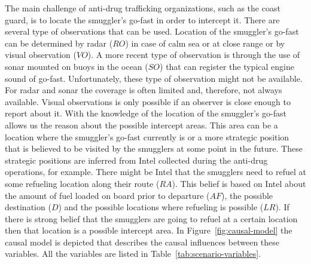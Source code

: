 \documentclass[conference]{IEEEtran}
\begin{document}
The main challenge of anti-drug trafficking organizations, such as the coast guard, is to locate the smuggler's go-fast in order to intercept it. There are several type of observations that can be used. Location of the smuggler's go-fast can be determined by radar ($RO$) in case of calm sea or at close range or by visual observation ($VO$). A more recent type of observation is through the use of sonar mounted on buoys in the ocean ($SO$) that can register the typical engine sound of go-fast. Unfortunately, these type of observation might not be available. For radar and sonar the coverage is often limited and, therefore, not always available. Visual observations is only possible if an observer is close enough to report about it. With the knowledge of the location of the smuggler's go-fast allows us the reason about the possible intercept areas. This area can be a location where the smuggler's go-fast currently is or a more strategic position that is believed to be visited by the smugglers at some point in the future. These strategic positions are inferred from Intel collected during the anti-drug operations, for example. There might be Intel that the smugglers need to refuel at some refueling location along their route ($RA$). This belief is based on Intel about the amount of fuel loaded on board prior to departure ($AF$), the possible destination ($D$) and the possible locations where refueling is possible ($LR$). If there is strong belief that the smugglers are going to refuel at a certain location then that location is a possible intercept area. In Figure~\ref{fig:causal-model} the causal model is depicted that describes the causal influences between these variables. All the variables are listed in Table~\ref{tab:scenario-variables}.
\end{document}
